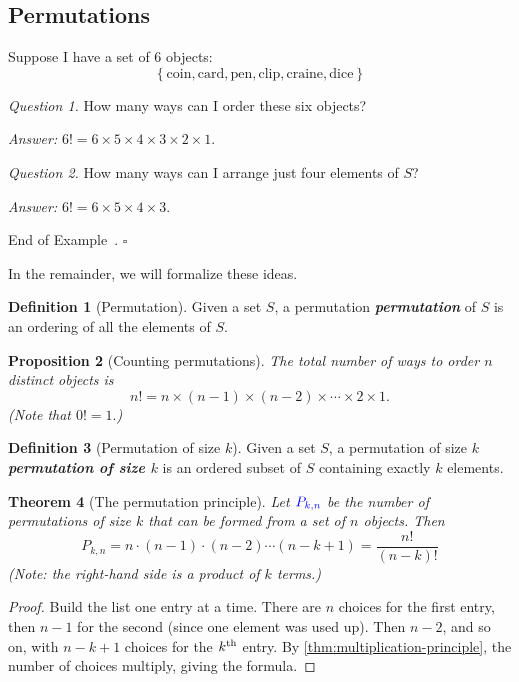 \documentclass[10pt]{article}
\newtheorem{theorem}{Theorem}
\newtheorem{proposition}[theorem]{Proposition}
\theoremstyle{definition}
\newtheorem{definition}[theorem]{Definition}
\newtheorem{example}[theorem]{Example}
\renewenvironment{example}
{\begin{oldexample}}
  {\par\smallskip\hfill   End of Example~\theexample. $\square$    \par\end{oldexample}}
\newcommand{\1}[1]{\textbf{1}_{\left[#1\right]}} %
\DeclareRobustCommand{\demph}[1]{%
  \ifmmode
  {\color{Blue}#1}%
  \else
  {\color{Blue}\bfseries\slshape #1}%
  \fi
}
\begin{document}
\subsection{Permutations}


\begin{example}
  Suppose I have a set of 6 objects:
  \begin{equation*}
    \left\{\text{coin}, \text{card}, \text{pen}, \text{clip}, \text{craine}, \text{dice}\right\} 
  \end{equation*}
  
  \textit{Question 1.} How many ways can I order these six objects?

  \textit{Answer:} $6! = 6\times 5\times 4\times 3\times 2\times 1$.

  \vspace{1em}
  \textit{Question 2.} How many ways can I arrange just four elements of $S$?

  \textit{Answer:} $6! = 6\times 5\times 4\times 3$.
\end{example}
In the remainder, we will formalize these ideas.



\begin{definition}[Permutation]
  Given a set $S$, a \demph{permutation} of $S$ is an ordering of all the elements
  of $S$.
\end{definition}

\begin{proposition}[Counting permutations]
  \label{prop:counting-permutations}
  The total number of ways to order $n$ distinct objects is
  \begin{equation*}
    n! = n \times (n-1)\times(n-2)\times\cdots\times 2 \times 1.
  \end{equation*}
  (Note that $0! = 1.$)
\end{proposition}

\begin{definition}[Permutation of size $k$] 
  Given a set $S$, a \demph{permutation of size $k$} is an ordered subset of $S$
  containing exactly $k$ elements.
\end{definition}
\begin{theorem}[The permutation principle]
  \label{thm:permutation-principle}
  Let $\demph{P_{k,n}}$ be the number of permutations of size $k$ that can be
  formed from a set of $n$ objects. Then
  \begin{equation*}
    P_{k,n} = n\cdot (n-1)\cdot (n-2)\cdots (n-k+1) = \frac{n!}{(n-k)!}
  \end{equation*}
  (Note: the right-hand side is a product of $k$ terms.)
\end{theorem}
\begin{proof}
  Build the list one entry at a time. There are $n$ choices for the first
  entry, then $n-1$ for the second (since one element was used up). Then
  $n-2$, and so on, with $n-k+1$ choices for the $k^{\rm th}$ entry. By
  \cref{thm:multiplication-principle}, the number of choices multiply, giving
  the formula.
\end{proof}
\end{document}
